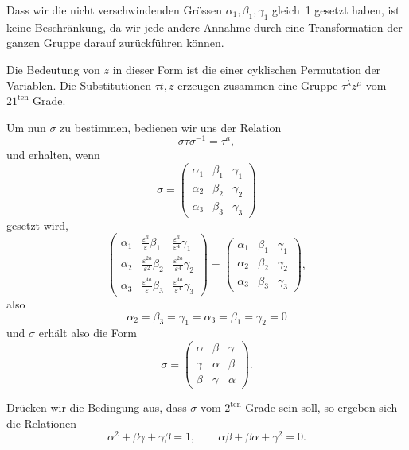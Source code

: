\documentclass[12pt,a4paper]{article}
\begin{document}
Dass wir die nicht verschwindenden Gr\"ossen $\alpha_1, \beta_1, \gamma_1$ gleich~1 gesetzt haben, ist keine Beschr\"ankung, da wir jede andere Annahme durch eine Transformation der ganzen Gruppe darauf zur\"uckf\"uhren k\"onnen.

Die Bedeutung von $z$ in dieser Form ist die einer cyklischen Permutation der Variablen. Die Substitutionen $\tau t, z$ erzeugen zusammen eine Gruppe $\tau^{\lambda} z^{\mu}$ vom $21^{\text{ten}}$ Grade.

Um nun $\sigma$ zu bestimmen, bedienen wir uns der Relation
\[\sigma \tau \sigma^{-1} = \tau^a,\]
und erhalten, wenn
\[ \sigma = \begin{pmatrix} \alpha_1 & \beta_1 & \gamma_1 \\ \alpha_2 & \beta_2 & \gamma_2 \\ \alpha_3 & \beta_3 & \gamma_3 \end{pmatrix} \]
gesetzt wird,
\[ \begin{pmatrix} \alpha_1 & \frac{\varepsilon^a}{\varepsilon}\beta_1 & \frac{\varepsilon^a}{\varepsilon^4}\gamma_1 \\ \alpha_2 & \frac{\varepsilon^{2a}}{\varepsilon^2}\beta_2 & \frac{\varepsilon^{2a}}{\varepsilon^4}\gamma_2 \\ \alpha_3 & \frac{\varepsilon^{4a}}{\varepsilon}\beta_3 & \frac{\varepsilon^{4a}}{\varepsilon^4}\gamma_3 \end{pmatrix} = \begin{pmatrix} \alpha_1 & \beta_1 & \gamma_1 \\ \alpha_2 & \beta_2 & \gamma_2 \\ \alpha_3 & \beta_3 & \gamma_3 \end{pmatrix}, \]
also
\[\alpha_2 = \beta_3 = \gamma_1 = \alpha_3 = \beta_1 = \gamma_2 = 0\]
und $\sigma$ erh\"alt also die Form
\begin{equation}
\label{eq:sigma} \sigma = \begin{pmatrix} \alpha & \beta & \gamma \\ \gamma & \alpha & \beta \\ \beta & \gamma & \alpha \end{pmatrix}.
\end{equation}

Dr\"ucken wir die Bedingung aus, dass $\sigma$ vom $2^{\text{ten}}$ Grade sein soll, so ergeben sich die Relationen
\begin{equation}
\label{eq:bed3} \alpha^2 + \beta\gamma + \gamma\beta = 1, \qquad \alpha\beta + \beta\alpha + \gamma^2 = 0.
\end{equation}
\end{document}
